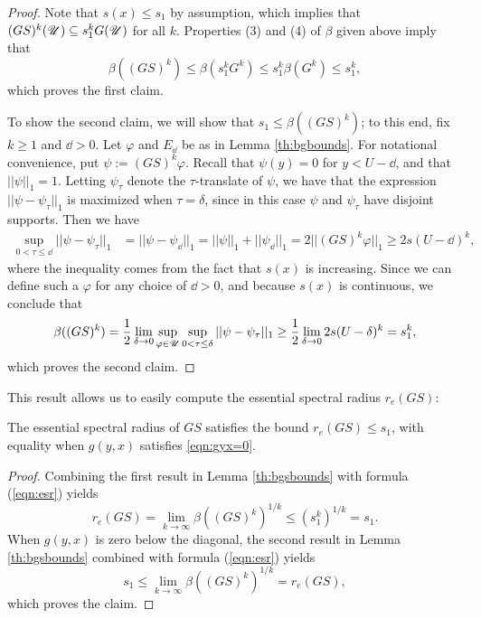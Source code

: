 \begin{proof}
	Note that $s(x) \leq s_1$ by assumption, which implies that $(GS)^k(\mathscr U) \subseteq s_1^k G(\mathscr U)$ for all $k$. Properties (3) and (4) of $\beta$ given above imply that
	\[\beta((GS)^k) \leq \beta(s_1^k G^k) \leq s_1^k \beta(G^k) \leq s_1^k,\]
	which proves the first claim.
	
	To show the second claim, we will show that $s_1 \leq \beta((GS)^k)$; to this end, fix $k \geq 1$ and $\dd>0$.  Let $\varphi$ and $E_\dd$ be as in Lemma \ref{th:bgbounds}. For notational convenience, put $\psi:=(GS)^k\varphi$. Recall that $\psi(y)=0$ for $y < U-\dd$, and that $||\psi||_1=1$. Letting $\psi_\tau$ denote the $\tau$-translate of $\psi$, we have that the expression $||\psi-\psi_\tau||_1$ is maximized when $\tau=\delta$, since in this case $\psi$ and $\psi_\tau$ have disjoint supports. Then we have
	\begin{align*}
		\sup_{0<\tau \leq \dd} ||\psi-\psi_\tau||_1 &= ||\psi - \psi_\dd||_1 = ||\psi||_1 + ||\psi_\dd||_1 = 2 ||(GS)^k \varphi||_1 \geq 2 s(U-\dd)^k,
	\end{align*}
	where the inequality comes from the fact that $s(x)$ is increasing. Since we can define such a $\varphi$ for any choice of $\dd>0$, and because $s(x)$ is continuous, we conclude that
	\begin{align*}
		\beta((GS)^k) = \frac 12 \lim_{\delta \to 0} \sup_{\varphi \in \mathscr U} \sup_{0<\tau \leq \delta} ||\psi-\psi_{\tau}||_1 \geq \frac 12 \lim_{\delta \to 0} 2 s(U-\delta)^k =s_1^k,
	\end{align*}
	which proves the second claim.
	
\end{proof}

This result allows us to easily compute the  essential spectral radius $r_e(GS)$:

\begin{corollary}\label{th:esrofGS}
	The essential spectral radius of $GS$ satisfies the bound $r_e(GS) \leq s_1$, with equality when $g(y,x)$ satisfies \eqref{eqn:gyx=0}.
\end{corollary}

\begin{proof}
	Combining the first result in Lemma \ref{th:bgsbounds} with formula (\ref{eqn:esr}) yields
	\[r_e(GS) = \lim_{k \to \infty} \beta((GS)^k)^{1/k} \leq (s_1^k)^{1/k} = s_1.\]
	When $g(y,x)$ is zero below the diagonal, the second result in Lemma \ref{th:bgsbounds} combined with formula (\ref{eqn:esr}) yields
	\[s_1 \leq \lim_{k \to \infty} \beta ((GS)^k)^{1/k} = r_e(GS),\]
	which proves the claim.	
\end{proof}

